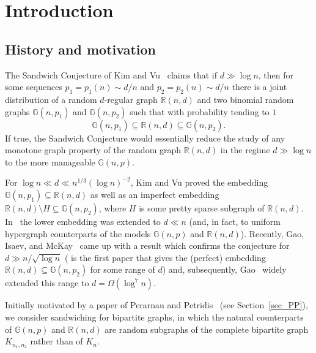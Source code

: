 \documentclass[12pt,reqno]{amsart}
\newcommand{\R} {\mathbb R}
\newcommand{\G} {\mathbb G}
\newcommand{\Knn} {K_{n_1,n_2}}
\theoremstyle{definition}
\begin{document}
\maketitle


\section{Introduction}
\label{intro}

\subsection{History and motivation}

The Sandwich Conjecture of Kim and Vu~\cite{KV04} claims that if $d \gg \log n$, then for some sequences $p_1 = p_1(n) \sim d/n$ and $p_2 = p_2(n) \sim d/n$ there is a joint distribution of a random $d$-regular graph $\R(n,d)$ and two binomial random graphs $\G(n,p_1)$ and $\G(n,p_2)$ such that with probability tending to $1$
\begin{equation*}
  \G(n,p_1) \subseteq \R(n,d) \subseteq \G(n,p_2).
\end{equation*}
If true, the Sandwich Conjecture would essentially reduce the study of any monotone graph property of the random graph $\R(n,d)$ in the regime $d \gg \log n$ to the more manageable  $\G(n,p)$.

For $\log n \ll d \ll n^{1/3}(\log n)^{-2}$, Kim and Vu proved the embedding $\G(n,p_1) \subseteq \R(n,d)$ as well as an imperfect embedding $\R(n,d) \setminus H \subseteq \G(n,p_2)$, where $H$ is some pretty sparse subgraph of $\R(n,d)$. In~\cite{DFRSc} the lower embedding was extended to $d \ll n$ (and, in fact, to uniform hypergraph counterparts of the models $\G(n,p)$ and $\R(n,d)$). Recently, Gao, Isaev, and McKay~\cite{GIM} came up with a result which confirms the conjecture  for $d \gg n/\sqrt{\log n}$ (\cite{GIM} is the first paper that gives the (perfect) embedding $\R(n,d) \subseteq \G(n,p_2)$ for some range of $d$) and, subsequently, Gao~\cite{G20} widely extended this range to $d=\Omega(\log^7n)$.


Initially motivated by a paper of Perarnau and Petridis~\cite{PePe} (see Section~\ref{sec_PP}), we consider sandwiching for bipartite graphs, in which the natural counterparts of $\G(n,p)$ and $\R(n,d)$  are random subgraphs of the complete bipartite graph $\Knn$ rather than of $K_n$.
\end{document}
